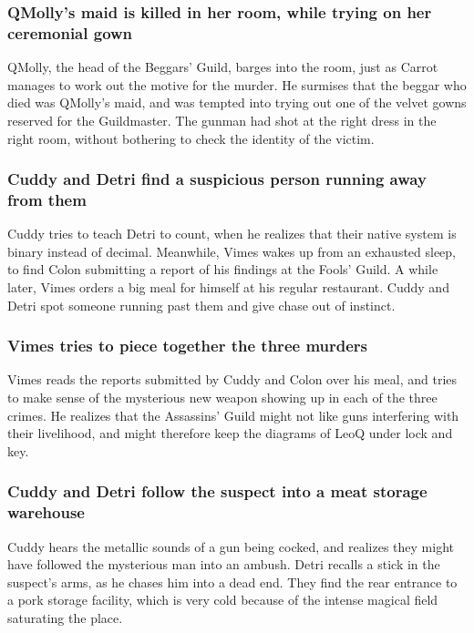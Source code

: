 \subsubsection{\Gls{QMolly}'s maid is killed in her room, while trying on her ceremonial gown}
\Gls{QMolly}, the head of the Beggars' Guild, barges into the room, just as \Gls{Carrot} manages to
work out the motive for the murder. He surmises that the beggar who died was \Gls{QMolly}'s maid,
and was tempted into trying out one of the velvet gowns reserved for the Guildmaster. The gunman
had shot at the right dress in the right room, without bothering to check the identity of the
victim.

\subsubsection{\Gls{Cuddy} and \Gls{Detri} find a suspicious person running away from them}
\Gls{Cuddy} tries to teach \Gls{Detri} to count, when he realizes that their native system is binary
instead of decimal. Meanwhile, \Gls{Vimes} wakes up from an exhausted sleep, to find \Gls{Colon}
submitting a report of his findings at the Fools' Guild. A while later, \Gls{Vimes} orders a big
meal for himself at his regular restaurant. \Gls{Cuddy} and \Gls{Detri} spot someone running past
them and give chase out of instinct.

\subsubsection{\Gls{Vimes} tries to piece together the three murders}
\Gls{Vimes} reads the reports submitted by \Gls{Cuddy} and \Gls{Colon} over his meal, and tries to
make sense of the mysterious new weapon showing up in each of the three crimes. He realizes that the
Assassins' Guild might not like guns interfering with their livelihood, and might therefore keep
the diagrams of \Gls{LeoQ} under lock and key.

\subsubsection{\Gls{Cuddy} and \Gls{Detri} follow the suspect into a meat storage warehouse}
\Gls{Cuddy} hears the metallic sounds of a gun being cocked, and realizes they might have followed
the mysterious man into an ambush. \Gls{Detri} recalls a stick in the suspect's arms, as he chases
him into a dead end. They find the rear entrance to a pork storage facility, which is very cold
because of the intense magical field saturating the place.


